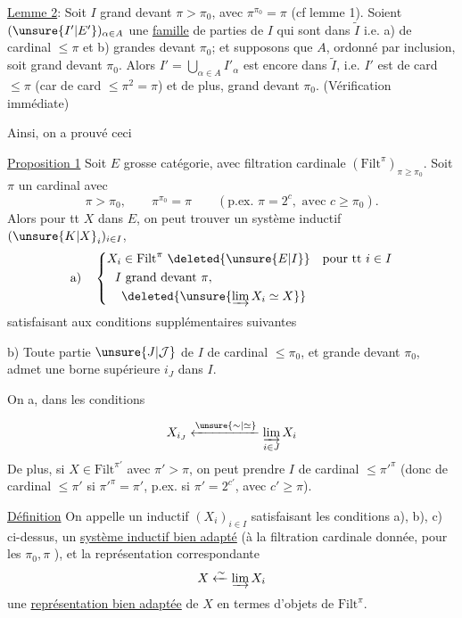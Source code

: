 \uline{Lemme 2}: Soit $I$ grand devant $\pi>\pi_0$, avec $\pi^{\pi_0}=\pi$ (cf lemme 1). Soient $(\unsure{I'|E'})_{\alpha\in A}$ une \uline{famille} de parties de $I$ qui sont dans $\widetilde I$ i.e. a) de cardinal $\leq\pi$ et b) grandes devant $\pi_0$; et supposons que  $A$, ordonné par inclusion, soit grand devant $\pi_0$. Alors $I'=\bigcup_{\alpha\in A}I'_\alpha$ est encore dans $\widetilde I$, i.e. $I'$ est de card $\leq\pi$ (car de card $\leq\pi^2=\pi$) et de plus, grand devant $\pi_0$. (Vérification immédiate)

Ainsi, on a prouvé ceci

\uline{Proposition 1} Soit $E$ grosse catégorie, avec filtration cardinale $(\mathrm{Filt}^{\pi})_{\pi\geq\pi_0}$. Soit $\pi$ un cardinal avec
\margin{$\big|$}
\[
\pi>\pi_0,\qquad\pi^{\pi_0}=\pi\qquad(\text{p.ex. }\pi=2^c,\text{ avec }c\geq\pi_0).
\]
Alors pour tt $X$ dans $E$, on peut trouver un système inductif $(\unsure{K|X}_i)_{i\in I}$,  
\margin{$\big|$}
\[
\text{a)}\quad\left\{\begin{aligned}
X_i&\in\mathrm{Filt}^{\pi}\ \deleted{\unsure{E|I}}\quad\text{pour tt }i\in I\\
I&\text{ grand devant }\pi,\\
&\deleted{\unsure{\varinjlim X_i\simeq X}}
\end{aligned}\right.
\]
satisfaisant aux conditions supplémentaires suivantes

b) Toute partie $\unsure{J|\mathcal J}$ de $I$ de cardinal $\leq\pi_0$, et grande devant $\pi_0$, admet une borne supérieure $i_J$ dans $I$.

 On  a, dans les conditions

\[
X_{i_J}\xleftarrow{\unsure{\sim|\simeq}}\varinjlim_{i\in J}X_i
\]
De plus, si $X\in\mathrm{Filt}^{\pi'}$ avec $\pi'>\pi$, on peut prendre $I$ de cardinal $\leq\pi'^\pi$ (donc de cardinal $\leq\pi'$ si $\pi'^\pi=\pi'$, p.ex. si $\pi'=2^{c'}$, avec $c'\geq\pi$).

\uline{Définition} On appelle un   inductif $(X_i)_{i\in I}$ satisfaisant les conditions a), b), c) ci-dessus, un \uline{système inductif bien adapté} (à la filtration cardinale donnée, pour les   $\pi_0,\pi$  ), et la représentation correspondante
\[
X\xleftarrow{\sim}\varinjlim X_i
\]
une \uline{représentation bien adaptée} de $X$ en termes d'objets de $\mathrm{Filt}^{\pi}$.

